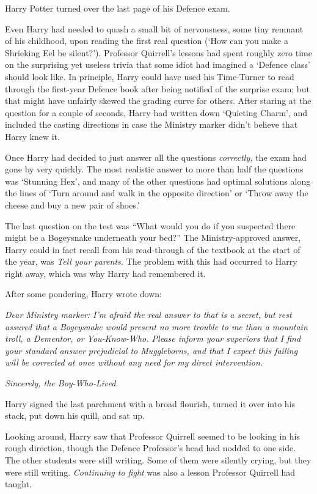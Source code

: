 \later

Harry Potter turned over the last page of his Defence exam.

Even Harry had needed to quash a small bit of nervousness, some tiny remnant of his childhood, upon reading the first real question (‘How can you make a Shrieking Eel be silent?’). Professor Quirrell’s lessons had spent roughly zero time on the surprising yet useless trivia that some idiot had imagined a ‘Defence class’ should look like. In principle, Harry could have used his Time-Turner to read through the first-year Defence book after being notified of the surprise exam; but that might have unfairly skewed the grading curve for others. After staring at the question for a couple of seconds, Harry had written down ‘Quieting Charm’, and included the casting directions in case the Ministry marker didn’t believe that Harry knew it.

Once Harry had decided to just answer all the questions \emph{correctly,} the exam had gone by very quickly. The most realistic answer to more than half the questions was ‘Stunning Hex’, and many of the other questions had optimal solutions along the lines of ‘Turn around and walk in the opposite direction’ or ‘Throw away the cheese and buy a new pair of shoes.’

The last question on the test was “What would you do if you suspected there might be a Bogeysnake underneath your bed?” The Ministry-approved answer, Harry could in fact recall from his read-through of the textbook at the start of the year, was \emph{Tell your parents.} The problem with this had occurred to Harry right away, which was why Harry had remembered it.

After some pondering, Harry wrote down:

\emph{Dear Ministry marker: I’m afraid the real answer to that is a secret, but rest assured that a Bogeysnake would present no more trouble to me than a mountain troll, a Dementor, or You-Know-Who. Please inform your superiors that I find your standard answer prejudicial to Muggleborns, and that I expect this failing will be corrected at once without any need for my direct intervention.}

\emph{Sincerely, the Boy-Who-Lived.}

Harry signed the last parchment with a broad flourish, turned it over into his stack, put down his quill, and sat up.

Looking around, Harry saw that Professor Quirrell seemed to be looking in his rough direction, though the Defence Professor’s head had nodded to one side. The other students were still writing. Some of them were silently crying, but they were still writing. \emph{Continuing to fight} was also a lesson Professor Quirrell had taught.

